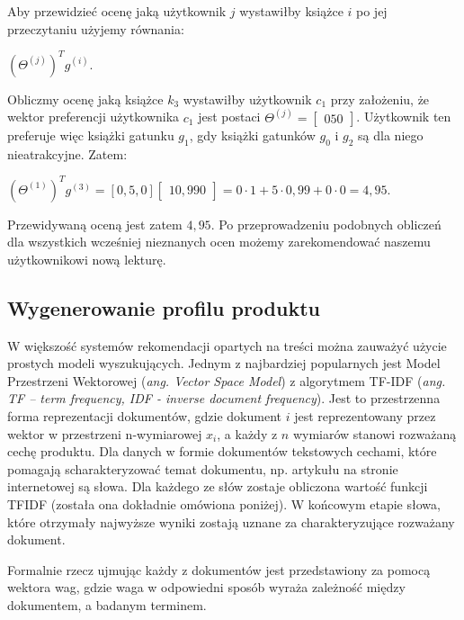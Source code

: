 \documentclass[12pt,a4paper]{report}
\begin{document}
Aby przewidzieć ocenę jaką użytkownik $j$ wystawiłby książce $i$ po jej przeczytaniu użyjemy równania:
\begin{center}
$(\Theta^{(j)})^T g^{(i)}$.
\end{center}
\bigskip
Obliczmy ocenę jaką książce $k_3$ wystawiłby użytkownik $c_1$ przy założeniu, że wektor preferencji użytkownika $c_1$ jest postaci $\Theta^{(j)}= \left[
        \begin{array}{c}
         0 
         5
         0
         \end{array}
      \right] $. Użytkownik ten preferuje więc książki gatunku $g_1$, gdy książki gatunków $g_0$ i $g_2$ są dla niego nieatrakcyjne.
Zatem:
\begin{center}
$(\Theta^{(1)})^T g^{(3)} = [0,5,0] \left[
        \begin{array}{c}
         1 
         0,99
         0
         \end{array}
      \right] = 0 \cdot 1 + 5 \cdot 0,99 + 0 \cdot 0 = 4,95$.
\end{center}
Przewidywaną oceną jest zatem $4,95$. Po przeprowadzeniu podobnych obliczeń dla wszystkich wcześniej nieznanych ocen możemy zarekomendować naszemu użytkownikowi nową lekturę.
\subsection{Wygenerowanie profilu produktu}
W większość systemów rekomendacji opartych na treści można zauważyć użycie prostych modeli wyszukujących. Jednym z najbardziej popularnych jest Model Przestrzeni Wektorowej (\textit{ang. Vector Space Model}) z algorytmem TF-IDF (\textit{ang. TF – term frequency, IDF - inverse document frequency}). Jest to przestrzenna forma reprezentacji dokumentów, gdzie dokument $i$ jest reprezentowany przez wektor w przestrzeni n-wymiarowej $x_{i}$, a każdy z $n$ wymiarów stanowi rozważaną cechę produktu. Dla danych w formie dokumentów tekstowych cechami, które pomagają scharakteryzować temat dokumentu, np. artykułu na stronie internetowej są słowa. Dla każdego ze słów zostaje obliczona wartość funkcji TFIDF (została ona dokładnie omówiona poniżej). W końcowym etapie słowa, które otrzymały najwyższe wyniki zostają uznane za charakteryzujące rozważany dokument.

Formalnie rzecz ujmując każdy z dokumentów jest przedstawiony za pomocą wektora wag, gdzie waga w odpowiedni sposób wyraża zależność między dokumentem, a badanym terminem.
\end{document}
